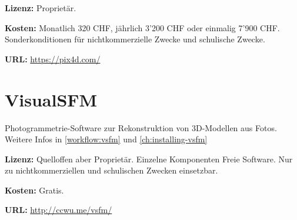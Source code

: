 {\textbf{Lizenz:} Proprietär.

\textbf{Kosten:} Monatlich 320 CHF, jährlich 3'200 CHF oder einmalig 7'900 CHF.
Sonderkonditionen für nichtkommerzielle Zwecke und schulische Zwecke.

\textbf{URL:} \url{https://pix4d.com/}


\section{VisualSFM}

Photogrammetrie-Software zur Rekonstruktion von 3D-Modellen aus Fotos. Weitere
Infos in \autoref{workflow:vsfm} und \autoref{ch:installing-vsfm}

\textbf{Lizenz:} Quelloffen aber Proprietär. Einzelne Komponenten Freie Software. Nur zu
nichtkommerziellen und schulischen Zwecken einsetzbar.

\textbf{Kosten:} Gratis.

\textbf{URL:} \url{http://ccwu.me/vsfm/}

}
